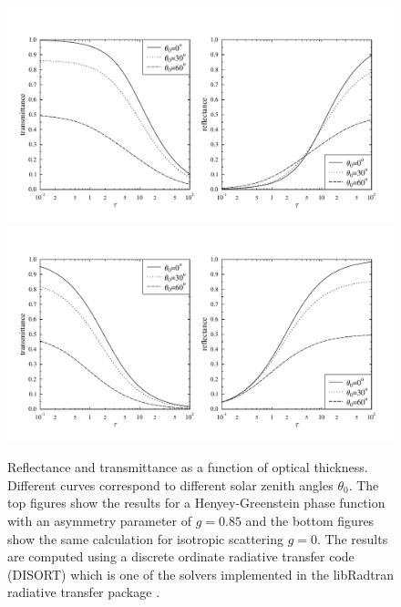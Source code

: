 \documentclass[12pt,twoside,a4paper]{article}
\begin{document}
\begin{figure}[htbp]
  \centering
  \includegraphics[width=1.\hsize]{./figs/plot_gg085_alb0.pdf}\\
  \includegraphics[width=1.\hsize]{./figs/plot_gg0_alb0.pdf}\\
  \caption{Reflectance and transmittance as a function of optical
    thickness. Different curves correspond to different solar zenith
    angles $\theta_0$. The top figures show the results for a
    Henyey-Greenstein phase function with an asymmetry parameter of
    $g=0.85$ and the bottom figures show the same calculation for
    isotropic scattering $g=0$. The results are computed using a
    discrete ordinate radiative transfer code (DISORT) which is one of
    the solvers implemented in the libRadtran radiative transfer
    package \citep{mayer2005}.}
    \label{fig:cloudonly_result}
\end{figure}
\end{document}
